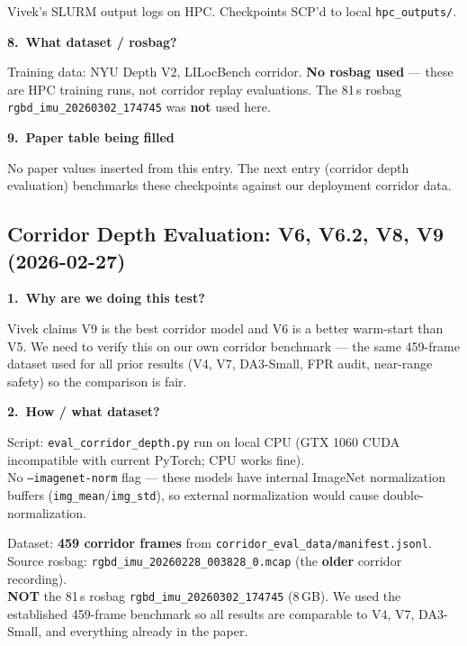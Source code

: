 \documentclass[11pt,a4paper]{article}
\begin{document}
Vivek's SLURM output logs on HPC.  Checkpoints SCP'd to local
\texttt{hpc\_outputs/}.

\textbf{8.\ What dataset / rosbag?}

Training data: NYU Depth V2, LILocBench corridor.
\textbf{No rosbag used} --- these are HPC training runs, not corridor
replay evaluations.  The 81\,s rosbag
\texttt{rgbd\_imu\_20260302\_174745} was \textbf{not} used here.

\textbf{9.\ Paper table being filled}

No paper values inserted from this entry.  The next entry (corridor
depth evaluation) benchmarks these checkpoints against our deployment
corridor data.


\subsection*{Corridor Depth Evaluation: V6, V6.2, V8, V9 (2026-02-27)}

\textbf{1.\ Why are we doing this test?}

Vivek claims V9 is the best corridor model and V6 is a better warm-start
than V5.  We need to verify this on our own corridor benchmark --- the
same 459-frame dataset used for all prior results (V4, V7, DA3-Small,
FPR audit, near-range safety) so the comparison is fair.

\textbf{2.\ How / what dataset?}

Script: \texttt{eval\_corridor\_depth.py} run on local CPU
(GTX 1060 CUDA incompatible with current PyTorch; CPU works fine).\\
No \texttt{--imagenet-norm} flag --- these models have internal
ImageNet normalization buffers (\texttt{img\_mean}/\texttt{img\_std}),
so external normalization would cause double-normalization.

Dataset: \textbf{459 corridor frames} from
\texttt{corridor\_eval\_data/manifest.jsonl}.\\
Source rosbag: \texttt{rgbd\_imu\_20260228\_003828\_0.mcap} (the
\textbf{older} corridor recording).\\
\textbf{NOT} the 81\,s rosbag \texttt{rgbd\_imu\_20260302\_174745}
(8\,GB).  We used the established 459-frame benchmark so all results
are comparable to V4, V7, DA3-Small, and everything already in the
paper.
\end{document}
